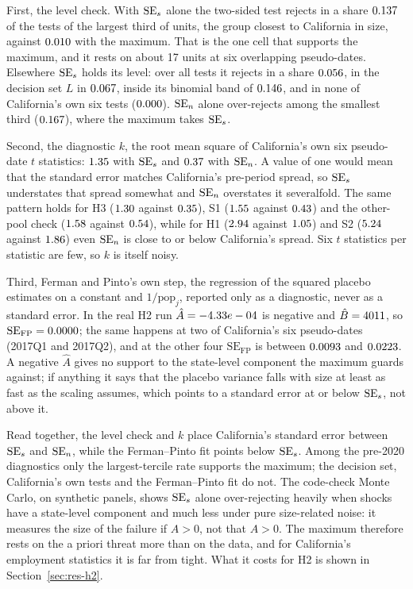 First, the level check. With $\mathrm{SE}_{s}$ alone the two-sided test rejects in a share
$0.137$ of the tests of the largest third of units, the group closest to
California in size, against $0.010$ with the maximum. That is the one cell that
supports the maximum, and it rests on about 17 units at six overlapping pseudo-dates. Elsewhere
$\mathrm{SE}_{s}$ holds its level: over all tests it rejects in a share $0.056$, in the decision
set $L$ in $0.067$, inside its binomial band of $0.146$, and in none of
California's own six tests ($0.000$). $\mathrm{SE}_{n}$ alone over-rejects among the smallest
third ($0.167$), where the maximum takes $\mathrm{SE}_{s}$.

Second, the diagnostic $k$, the root mean square of California's own six pseudo-date $t$
statistics: $1.35$ with $\mathrm{SE}_{s}$ and $0.37$ with $\mathrm{SE}_{n}$. A value of one would
mean that the standard error matches California's pre-period spread, so $\mathrm{SE}_{s}$ understates that
spread somewhat and $\mathrm{SE}_{n}$ overstates it severalfold. The same pattern holds for H3
($1.30$ against $0.35$), S1 ($1.55$ against
$0.43$) and the other-pool check ($1.58$ against
$0.54$), while for H1 ($2.94$ against $1.05$) and S2
($5.24$ against $1.86$) even $\mathrm{SE}_{n}$ is close to or below California's
spread. Six $t$ statistics per statistic are few, so $k$ is itself noisy.

Third, Ferman and Pinto's own step, the regression of the squared placebo estimates on a constant
and $1/\mathrm{pop}_j$, reported only as a diagnostic, never as a standard error. In the real H2
run $\hat A = -4.33e-04$ is negative and $\hat B = 4011$, so $\mathrm{SE}_{\mathrm{FP}} =
0.0000$; the same happens at two of California's six pseudo-dates (2017Q1 and 2017Q2), and at
the other four $\mathrm{SE}_{\mathrm{FP}}$ is between $0.0093$ and
$0.0223$. A negative $\hat A$ gives no support to the state-level component the
maximum guards against; if anything it says that the placebo variance falls with size at least as
fast as the scaling assumes, which points to a standard error at or below $\mathrm{SE}_{s}$, not above it.

Read together, the level check and $k$ place California's standard error between $\mathrm{SE}_{s}$ and
$\mathrm{SE}_{n}$, while the Ferman--Pinto fit points below $\mathrm{SE}_{s}$. Among the pre-2020 diagnostics only the
largest-tercile rate supports the maximum; the decision set, California's own tests and the
Ferman--Pinto fit do not. The code-check Monte Carlo, on synthetic panels, shows $\mathrm{SE}_{s}$ alone over-rejecting
heavily when shocks have a state-level component and much less under pure size-related noise: it
measures the size of the failure if $A > 0$, not that $A > 0$. The maximum therefore rests on the a priori threat more than on
the data, and for California's employment statistics it is far from tight. What it costs for H2 is
shown in Section~\ref{sec:res-h2}.

